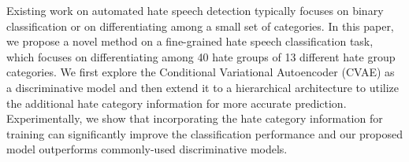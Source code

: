 Existing work on automated hate speech detection typically focuses on binary classification or on differentiating among a small set of categories. In this paper, we propose a novel method on a fine-grained hate speech classification task, which focuses on differentiating among 40 hate groups of 13 different hate group categories. We first explore the Conditional Variational Autoencoder (CVAE)  as a discriminative model and then extend it to a hierarchical architecture to utilize the additional hate category information for more accurate prediction. Experimentally, we show that incorporating the hate category information for training can significantly improve the classification performance and our proposed model outperforms commonly-used discriminative models.
